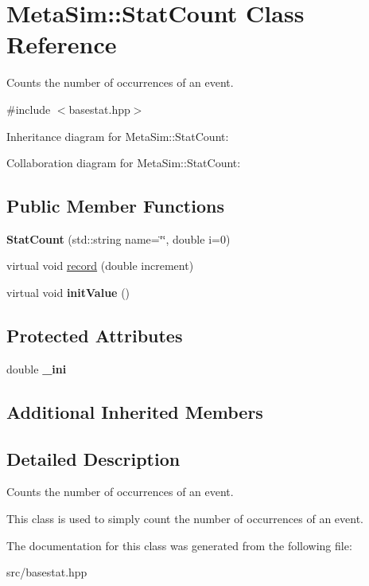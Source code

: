 \hypertarget{classMetaSim_1_1StatCount}{}\section{Meta\+Sim\+:\+:Stat\+Count Class Reference}
\label{classMetaSim_1_1StatCount}


Counts the number of occurrences of an event.  




{\ttfamily \#include $<$basestat.\+hpp$>$}



Inheritance diagram for Meta\+Sim\+:\+:Stat\+Count\+:


Collaboration diagram for Meta\+Sim\+:\+:Stat\+Count\+:
\subsection*{Public Member Functions}
\begin{DoxyCompactItemize}
\item 
{\bfseries Stat\+Count} (std\+::string name=\char`\"{}\char`\"{}, double i=0)
\item 
virtual void \hyperlink{group__metasim__stat_gaaafe9f379041d46cbe705d26aafc5c67}{record} (double increment)
\item 
virtual void {\bfseries init\+Value} ()
\end{DoxyCompactItemize}
\subsection*{Protected Attributes}
\begin{DoxyCompactItemize}
\item 
double {\bfseries \+\_\+ini}
\end{DoxyCompactItemize}
\subsection*{Additional Inherited Members}


\subsection{Detailed Description}
Counts the number of occurrences of an event. 

This class is used to simply count the number of occurrences of an event. 

The documentation for this class was generated from the following file\+:\begin{DoxyCompactItemize}
\item 
src/basestat.\+hpp\end{DoxyCompactItemize}
